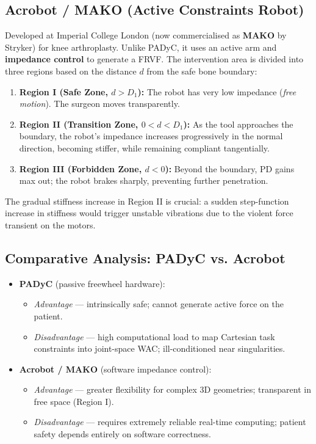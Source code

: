 \documentclass[11pt,a4paper,twoside]{report}
\begin{document}
\subsection{Acrobot / MAKO (Active Constraints Robot)}
Developed at Imperial College London (now commercialised as \textbf{MAKO} by Stryker) for knee arthroplasty. Unlike PADyC, it uses an active arm and \textbf{impedance control} to generate a FRVF.
The intervention area is divided into three regions based on the distance $d$ from the safe bone boundary:
\begin{enumerate}
    \item \textbf{Region I (Safe Zone, $d > D_1$):} The robot has very low impedance (\textit{free motion}). The surgeon moves transparently.
    \item \textbf{Region II (Transition Zone, $0 < d < D_1$):} As the tool approaches the boundary, the robot's impedance increases progressively in the normal direction, becoming stiffer, while remaining compliant tangentially.
    \item \textbf{Region III (Forbidden Zone, $d < 0$):} Beyond the boundary, PD gains max out; the robot brakes sharply, preventing further penetration.
\end{enumerate}
The gradual stiffness increase in Region II is crucial: a sudden step-function increase in stiffness would trigger unstable vibrations due to the violent force transient on the motors.

\subsection{Comparative Analysis: PADyC vs. Acrobot}
\begin{itemize}
    \item \textbf{PADyC} (passive freewheel hardware):
    \begin{itemize}
        \item \textit{Advantage} — intrinsically safe; cannot generate active force on the patient.
        \item \textit{Disadvantage} — high computational load to map Cartesian task constraints into joint-space WAC; ill-conditioned near singularities.
    \end{itemize}
    \item \textbf{Acrobot / MAKO} (software impedance control):
    \begin{itemize}
        \item \textit{Advantage} — greater flexibility for complex 3D geometries; transparent in free space (Region I).
        \item \textit{Disadvantage} — requires extremely reliable real-time computing; patient safety depends entirely on software correctness.
    \end{itemize}
\end{itemize}
\end{document}

